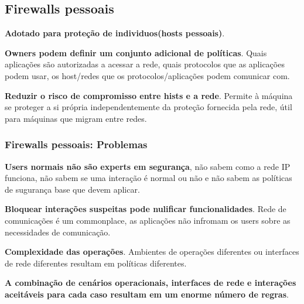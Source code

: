 \documentclass{article}
\begin{document}
\subsection{Firewalls pessoais}

\begin{flushleft}
  \textbf{Adotado para proteção de individuos(hosts pessoais)}.

  \vspace{2mm}

  \textbf{Owners podem definir um conjunto adicional de políticas}. Quais aplicações
  são autorizadas a acessar a rede, quais protocolos que as aplicações podem usar,
  os host/redes que os protocolos/aplicações podem comunicar com.

  \vspace{2mm}

  \textbf{Reduzir o risco de compromisso entre hists e a rede}. Permite
  à máquina se proteger a si própria independentemente da proteção fornecida
  pela rede, útil para máquinas que migram entre redes.
\end{flushleft}



\subsubsection{Firewalls pessoais: Problemas}

\begin{flushleft}
  \textbf{Users normais não são experts em segurança}, não sabem como
  a rede IP funciona, não sabem se uma interação é normal ou não e não
  sabem as políticas de sugurança base que devem aplicar.

  \vspace{2mm}

  \textbf{Bloquear interações suspeitas pode nulificar funcionalidades}.
  Rede de comunicações é um commonplace, as aplicações não infromam os users
  sobre as necessidades de comunicação.

  \vspace{2mm}

  \textbf{Complexidade das operações}. Ambientes de operações diferentes ou
  interfaces de rede diferentes resultam em políticas diferentes.

  \vspace{2mm}

  \textbf{A combinação de cenários operacionais, interfaces de rede e
  interações aceitáveis para cada caso resultam em um enorme número de
  regras}.
\end{flushleft}
\end{document}
